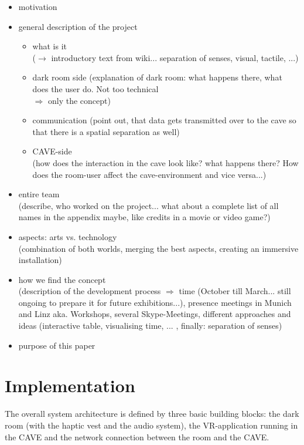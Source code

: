 \documentclass[conference]{acmsiggraph}
\begin{document}
\begin{itemize}
\item motivation
\item{
	general description of the project
	\begin{itemize}
	\item what is it\\
	 ($\rightarrow$ introductory text from wiki... separation of senses, visual, tactile, ...)
	\item dark room side (explanation of dark room: what happens there, what does the user do. Not too technical\\
	 $\Rightarrow$ only the concept)
	\item communication
	(point out, that data gets transmitted over to the cave so that there is a spatial separation as well)
	\item CAVE-side\\
	(how does the interaction in the cave look like? what happens there? How does the room-user affect the cave-environment and vice versa...)
	\end{itemize}
}
\item entire team\\
	  (describe, who worked on the project... what about a complete list of all names in the appendix maybe, like credits in a movie or video game?)
\item aspects: arts vs. technology\\
		(combination of both worlds, merging the best aspects, creating an immersive installation)
\item how we find the concept\\
		(description of the development process $\Rightarrow$ time (October till March... still ongoing to prepare it for future exhibitions...), presence meetings in Munich and Linz aka. Workshops, several Skype-Meetings, different approaches and ideas (interactive table, visualising time, ... , finally: separation of senses) 
\item purpose of this paper
\end{itemize}

\section{Implementation}





The overall system architecture is defined by three basic building blocks: the dark room (with the haptic vest and the audio system), the VR-application running in the CAVE and the network connection between the room and the CAVE.
\end{document}
